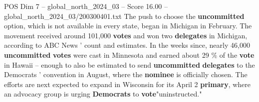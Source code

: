 \begin{textsample}{POS Dim 7 – global\_north\_2024\_03 – Score 16.00 – global\_north\_2024\_03/200300401.txt}
The push to choose the \textbf{uncommitted} option, which is not available in every state, began in Michigan in February.
The movement received around 101,000 \textbf{votes} and won two \textbf{delegates} in Michigan, according to ABC News ' count and estimates.
In the weeks since, nearly 46,000 \textbf{uncommitted} \textbf{votes} were cast in Minnesota and earned about 29 \% of the \textbf{vote} in Hawaii -- enough to also be estimated to send \textbf{uncommitted} \textbf{delegates} to the Democrats ' convention in August, where the \textbf{nominee} is officially chosen.
The efforts are next expected to expand in Wisconsin for its April 2 \textbf{primary}, where an advocacy group is urging \textbf{Democrats} to \textbf{vote}"uninstructed."

\end{textsample}
